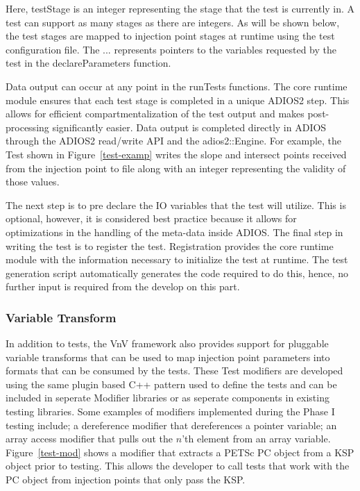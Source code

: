 Here, testStage is an integer representing the stage that the test is currently in. A test can support as many stages as there are integers. As will be shown below, the test 
stages are mapped to injection point stages at runtime using the test configuration file. The ... represents pointers to the variables requested by the test in the 
declareParameters function. 

Data output can occur at any point in the runTests functions. The core runtime module ensures that each test stage is completed in a unique ADIOS2 step. This allows for efficient 
compartmentalization of the test output and makes post-processing significantly easier. Data output is completed directly in ADIOS through the 
ADIOS2 read/write API and the adios2::Engine. For example, the Test shown in Figure~\ref{test-examp} writes the slope and intersect points received from the injection point
to file along with an integer representing the validity of those values. 

The next step is to pre declare the IO variables that the test will utilize. This is optional, however, it is considered best practice because it allows for optimizations 
in the handling of the meta-data inside ADIOS. The final step in writing the test is to register the test. Registration provides the core runtime module with the information 
necessary to initialize the test at runtime. The test generation script automatically generates the code required to do this, 
hence, no further input is required from the develop on this part. 

\subsubsection{Variable Transform}

In addition to tests, the VnV framework also provides support for pluggable variable transforms that can be used to 
map injection point parameters into formats that can be consumed by the tests. These Test modifiers are developed using 
the same plugin based C++ pattern used to define the tests and can be included in seperate Modifier libraries or as seperate 
components in existing testing libraries. Some examples of modifiers implemented during the Phase I testing include; a dereference modifier
that dereferences a pointer variable; an array access modifier that pulls out the $n$'th element from an array variable. Figure~\ref{test-mod} shows
a modifier that extracts a PETSc PC object from a KSP object prior to testing. This allows the developer to call tests that work with the PC object from
injection points that only pass the KSP. 

